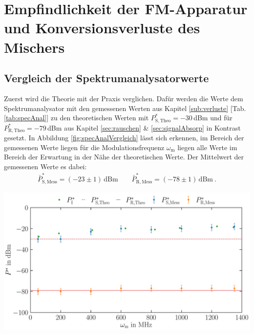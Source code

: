 
\section{Empfindlichkeit der FM-Apparatur und Konversionsverluste des Mischers}
\label{sec:verlusteAuswertung}

\subsection{Vergleich der Spektrumanalysatorwerte}
\label{sub:specAnalVergleich}

Zuerst wird die Theorie mit der Praxis verglichen. Dafür werden die Werte dem Spektrumanalysator mit den gemessenen Werten aus Kapitel \ref{sub:verluste} [Tab. \ref{tab:specAnal}] zu den theoretischen Werten mit $P^*_\mathrm{S,Theo} = -30$\,dBm und für $P^*_\mathrm{R,Theo}= -79$\,dBm aus Kapitel \ref{sec:rauschen} \& \ref{sec:signalAbsorp} in Kontrast gesetzt. In Abbildung \ref{fig:specAnalVergleich} lässt sich erkennen, im Bereich der gemessenen Werte liegen für die Modulationsfrequenz $\omega_\mathrm{m}$ liegen alle Werte im Bereich der Erwartung in der Nähe der theoretischen Werte. Der Mittelwert der gemessenen Werte es dabei:
\begin{gather}
    \boxed{\bar{P}^*_\mathrm{S,Mess} = (-23 \pm 1)\,\mathrm{dBm}} \qquad \boxed{\bar{P}^*_\mathrm{R,Mess} = (-78 \pm 1)\,\mathrm{dBm}}~.
\end{gather}
\begin{center}
    \captionsetup{type=figure}
    \includegraphics[scale=0.4]{Bilder/Auswertung/62/Signal-Rausch.pdf}
    \label{fig:specAnalVergleich}
\end{center}


